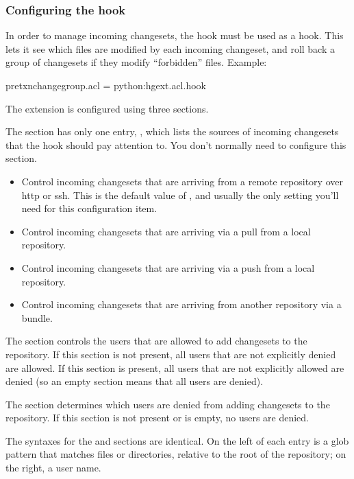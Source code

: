 \subsubsection{Configuring the  hook}

In order to manage incoming changesets, the  hook must be
used as a  hook.  This lets it see which files
are modified by each incoming changeset, and roll back a group of
changesets if they modify ``forbidden'' files.  Example:
\begin{codesample2}
  [hooks]
  pretxnchangegroup.acl = python:hgext.acl.hook
\end{codesample2}

The  extension is configured using three sections.  

The  section has only one entry, ,
which lists the sources of incoming changesets that the hook should
pay attention to.  You don't normally need to configure this section.
\begin{itemize}
\item[\rcitem{acl}{serve}] Control incoming changesets that are arriving
  from a remote repository over http or ssh.  This is the default
  value of , and usually the only setting you'll
  need for this configuration item.
\item[\rcitem{acl}{pull}] Control incoming changesets that are
  arriving via a pull from a local repository.
\item[\rcitem{acl}{push}] Control incoming changesets that are
  arriving via a push from a local repository.
\item[\rcitem{acl}{bundle}] Control incoming changesets that are
  arriving from another repository via a bundle.
\end{itemize}

The  section controls the users that are allowed to
add changesets to the repository.  If this section is not present, all
users that are not explicitly denied are allowed.  If this section is
present, all users that are not explicitly allowed are denied (so an
empty section means that all users are denied).

The  section determines which users are denied
from adding changesets to the repository.  If this section is not
present or is empty, no users are denied.

The syntaxes for the  and 
sections are identical.  On the left of each entry is a glob pattern
that matches files or directories, relative to the root of the
repository; on the right, a user name.

